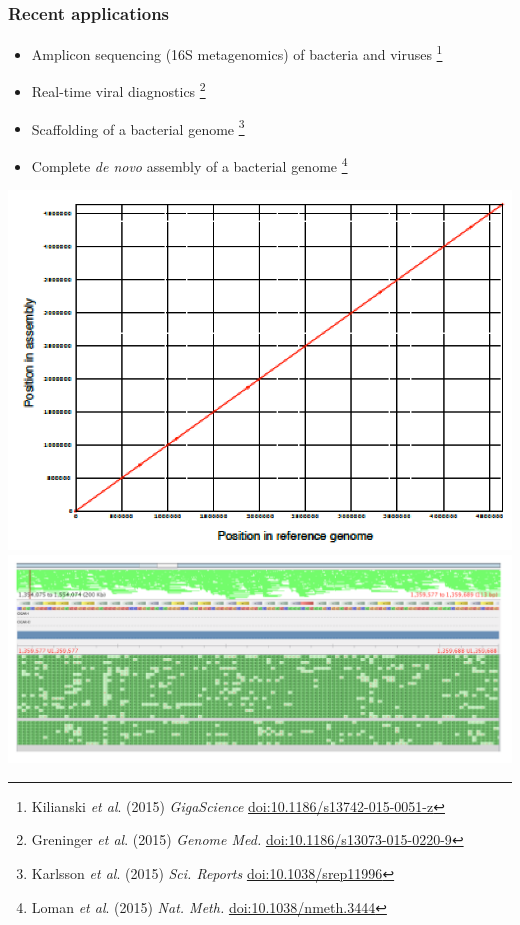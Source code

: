 \begin{frame}
  \frametitle{Recent applications}
  \begin{itemize}
    \item Amplicon sequencing (16S metagenomics) of bacteria and viruses \footnote{\tiny{Kilianski \textit{et al}. (2015) \textit{GigaScience} \href{http://dx.doi.org/10.1186/s13742-015-0051-z}{doi:10.1186/s13742-015-0051-z}}}
    \item Real-time viral diagnostics \footnote{\tiny{Greninger \textit{et al}. (2015) \textit{Genome Med.} \href{http://dx.doi.org/10.1186/s13073-015-0220-9}{doi:10.1186/s13073-015-0220-9}}}
    \item Scaffolding of a bacterial genome \footnote{\tiny{Karlsson \textit{et al}. (2015) \textit{Sci. Reports} \href{http://dx.doi.org/10.1038/srep11996}{doi:10.1038/srep11996}}}
    \item Complete \textit{de novo} assembly of a bacterial genome \footnote{\tiny{Loman \textit{et al}. (2015) \textit{Nat. Meth.} \href{http://dx.doi.org/10.1038/nmeth.3444}{doi:10.1038/nmeth.3444}}}
  \end{itemize}
    \begin{center}
      \includegraphics[height=0.3\textheight]{images/minion_asm_dotplot}
      \includegraphics[height=0.3\textheight]{images/minion_asm_tablet}
    \end{center}           
\end{frame}


